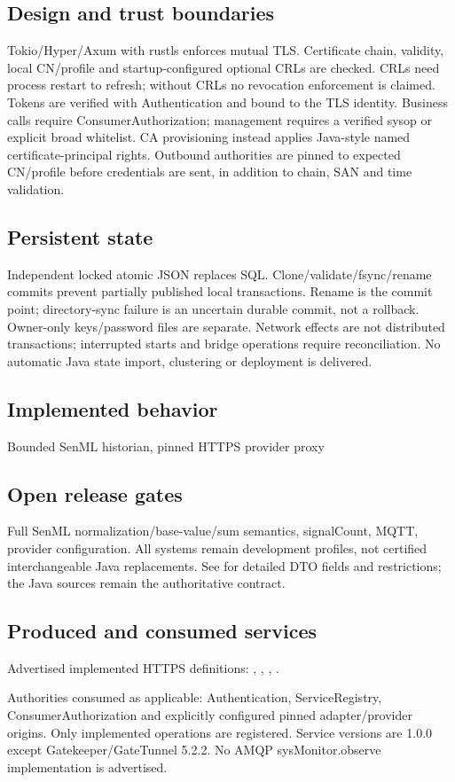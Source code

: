 \documentclass[a4paper]{arrowhead}
\begin{document}
\subsection{Design and trust boundaries}
Tokio/Hyper/Axum with rustls enforces mutual TLS. Certificate chain, validity, local CN/profile and startup-configured optional CRLs are checked. CRLs need process restart to refresh; without CRLs no revocation enforcement is claimed. Tokens are verified with Authentication and bound to the TLS identity. Business calls require ConsumerAuthorization; management requires a verified sysop or explicit broad whitelist. CA provisioning instead applies Java-style named certificate-principal rights. Outbound authorities are pinned to expected CN/profile before credentials are sent, in addition to chain, SAN and time validation.
\subsection{Persistent state}
Independent locked atomic JSON replaces SQL. Clone/validate/fsync/rename commits prevent partially published local transactions. Rename is the commit point; directory-sync failure is an uncertain durable commit, not a rollback. Owner-only keys/password files are separate. Network effects are not distributed transactions; interrupted starts and bridge operations require reconciliation. No automatic Java state import, clustering or deployment is delivered.
\subsection{Implemented behavior}
Bounded SenML historian, pinned HTTPS provider proxy
\subsection{Open release gates}
Full SenML normalization/base-value/sum semantics, signalCount, MQTT, provider configuration. All systems remain development profiles, not certified interchangeable Java replacements. See  for detailed DTO fields and restrictions; the Java sources remain the authoritative contract.
\subsection{Produced and consumed services}
Advertised implemented HTTPS definitions: , \allowbreak {}, \allowbreak {}, \allowbreak {}.\par
Authorities consumed as applicable: Authentication, ServiceRegistry, ConsumerAuthorization and explicitly configured pinned adapter/provider origins. Only implemented operations are registered. Service versions are 1.0.0 except Gatekeeper/GateTunnel 5.2.2. No AMQP sysMonitor.observe implementation is advertised.
\clearpage
\end{document}
